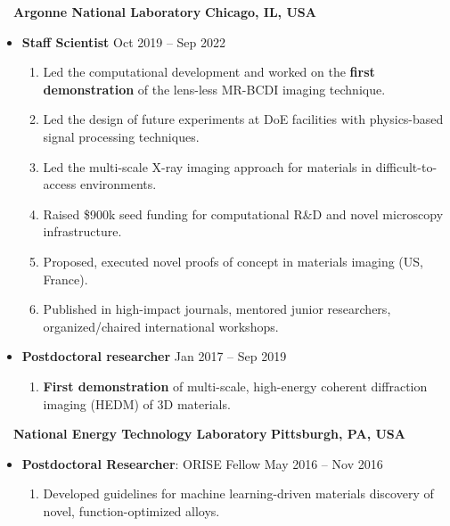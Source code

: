 \documentclass[10.5pt]{article}
\begin{document}
~~{\color{black}\textbf{Argonne National Laboratory} \hfill  \textbf{Chicago, IL, USA}}\par
\begin{itemize}
    \item
        \textbf{Staff Scientist}
        \hfill  {Oct 2019 -- Sep 2022} \par
        \begin{enumerate}
            \item Led the computational development and worked on the \textbf{first demonstration} of the lens-less MR-BCDI imaging technique.
            \item Led the design of future experiments at DoE facilities with physics-based signal processing techniques.
            \item Led the multi-scale X-ray imaging approach for materials in difficult-to-access environments.
            \item Raised \$900k seed funding for computational R\&D and novel microscopy infrastructure. 
            \item Proposed, executed novel proofs of concept in materials imaging (US, France).
            \item Published in high-impact journals, mentored junior researchers, organized/chaired international workshops.
        \end{enumerate}
    \item
        \textbf{Postdoctoral researcher}
        \hfill  {Jan 2017 -- Sep 2019} \par
        \begin{enumerate}
            \item \textbf{First demonstration} of multi-scale, high-energy coherent diffraction imaging (HEDM) of 3D materials.
        \end{enumerate}
\end{itemize} 

~~{\color{black}\textbf{National Energy Technology Laboratory} \hfill  \textbf{Pittsburgh, PA, USA}}\par
\begin{itemize}
    \item
        \textbf{Postdoctoral Researcher}: ORISE Fellow
        \hfill  {May 2016 -- Nov 2016} \par
        \begin{enumerate}
            \item Developed guidelines for machine learning-driven materials discovery of novel, function-optimized alloys.
        \end{enumerate}
\end{itemize} 
\end{document}
